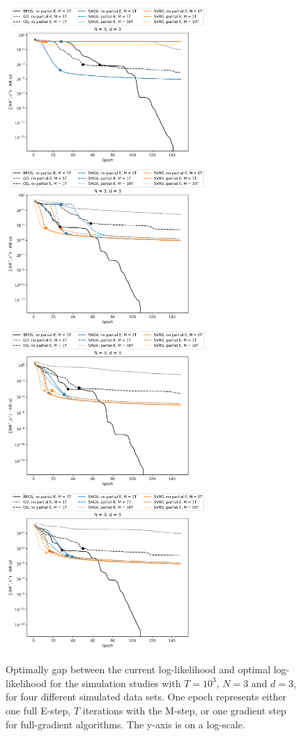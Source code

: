 \documentclass{article}
\begin{document}


\begin{figure}
    \centering
    \includegraphics[width=3in]{../plt/log-like_v_epoch_T-1000-K-3-1-d-3-001.png}
    \includegraphics[width=3in]{../plt/log-like_v_epoch_T-1000-K-3-1-d-3-002.png}
    \\
    \includegraphics[width=3in]{../plt/log-like_v_epoch_T-1000-K-3-1-d-3-003.png}
    \includegraphics[width=3in]{../plt/log-like_v_epoch_T-1000-K-3-1-d-3-004.png}   
    \caption{Optimally gap between the current log-likelihood and optimal log-likelihood for the simulation studies with $T=10^{3}$, $N=3$ and $d=3$, for four different simulated data sets. One epoch represents either one full E-step, $T$ iterations with the M-step, or one gradient step for full-gradient algorithms. The y-axis is on a log-scale.}
\end{figure}
\end{document}
